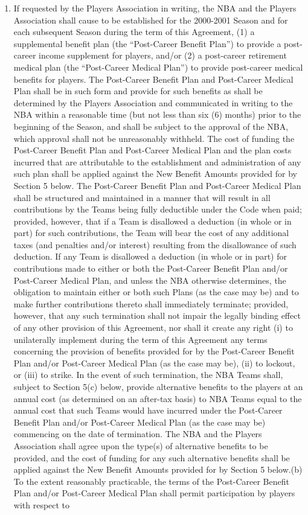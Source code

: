 \documentclass[
]{book}
\providecommand{\tightlist}{%
  \setlength{\itemsep}{0pt}\setlength{\parskip}{0pt}}
\begin{document}
\begin{enumerate}
\def\labelenumi{(\alph{enumi})}
\tightlist
\item
  If requested by the Players Association in writing, the NBA and the Players Association shall cause to be established for the 2000-2001 Season and for each subsequent Season during the term of this Agreement, (1) a supplemental benefit plan (the ``Post-Career Benefit Plan'') to provide a post-career income supplement for players, and/or (2) a post-career retirement medical plan (the ``Post-Career Medical Plan'') to provide post-career medical benefits for players. The Post-Career Benefit Plan and Post-Career Medical Plan shall be in such form and provide for such benefits as shall be determined by the Players Association and communicated in writing to the NBA within a reasonable time (but not less than six (6) months) prior to the beginning of the Season, and shall be subject to the approval of the NBA, which approval shall not be unreasonably withheld. The cost of funding the Post-Career Benefit Plan and Post-Career Medical Plan and the plan costs incurred that are attributable to the establishment and administration of any such plan shall be applied against the New Benefit Amounts provided for by Section 5 below. The Post-Career Benefit Plan and Post-Career Medical Plan shall be structured and maintained in a manner that will result in all contributions by the Teams being fully deductible under the Code when paid; provided, however, that if a Team is disallowed a deduction (in whole or in part) for such contributions, the Team will bear the cost of any additional taxes (and penalties and/or interest) resulting from the disallowance of such deduction. If any Team is disallowed a deduction (in whole or in part) for contributions made to either or both the Post-Career Benefit Plan and/or Post-Career Medical Plan, and unless the NBA otherwise determines, the obligation to maintain either or both such Plans (as the case may be) and to make further contributions thereto shall immediately terminate; provided, however, that any such termination shall not impair the legally binding effect of any other provision of this Agreement, nor shall it create any right (i) to unilaterally implement during the term of this Agreement any terms concerning the provision of benefits provided for by the Post-Career Benefit Plan and/or Post-Career Medical Plan (as the case may be), (ii) to lockout, or (iii) to strike. In the event of such termination, the NBA Teams shall, subject to Section 5(c) below, provide alternative benefits to the players at an annual cost (as determined on an after-tax basis) to NBA Teams equal to the annual cost that such Teams would have incurred under the Post-Career Benefit Plan and/or Post-Career Medical Plan (as the case may be) commencing on the date of termination. The NBA and the Players Association shall agree upon the type(s) of alternative benefits to be provided, and the cost of funding for any such alternative benefits shall be applied against the New Benefit Amounts provided for by Section 5 below.(b) To the extent reasonably practicable, the terms of the Post-Career Benefit Plan and/or Post-Career Medical Plan shall permit participation by players with respect to 
\end{enumerate}
\end{document}
